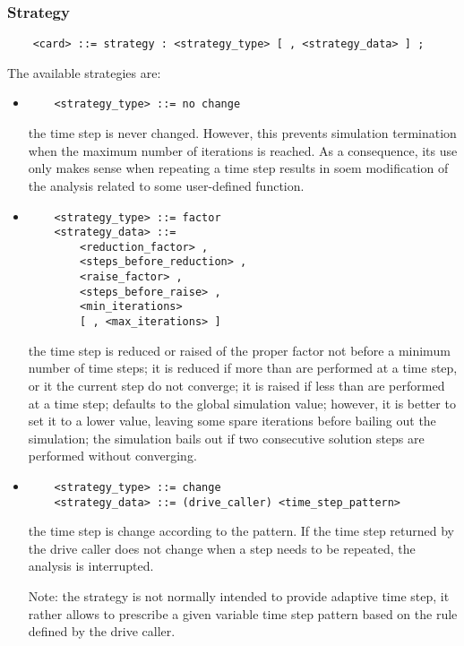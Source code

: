 \subsubsection{Strategy}
\begin{verbatim}
    <card> ::= strategy : <strategy_type> [ , <strategy_data> ] ;
\end{verbatim}
The available strategies are:
\begin{itemize}
\item {}
\begin{verbatim}
    <strategy_type> ::= no change 
\end{verbatim}
the time step is never changed.
However, this prevents simulation termination when the maximum number
of iterations is reached.
As a consequence, its use only makes sense when repeating a time step
results in soem modification of the analysis related to some user-defined
function.

\item {}
\begin{verbatim}
    <strategy_type> ::= factor
    <strategy_data> ::= 
        <reduction_factor> ,
        <steps_before_reduction> ,
        <raise_factor> ,
        <steps_before_raise> ,
        <min_iterations>
        [ , <max_iterations> ]
\end{verbatim}
the time step is reduced or raised of the proper factor not before a
minimum number of time steps; it is reduced if more than 
 are performed at a time step, or it the current
step do not converge; it is raised if less
than  are performed at a time step;
 defaults to the global 
simulation value; however, it is better to set it to a lower value,
leaving some spare iterations before bailing out the simulation; 
the simulation bails out if two consecutive solution steps
are performed without converging.

\item {}
\begin{verbatim}
    <strategy_type> ::= change
    <strategy_data> ::= (drive_caller) <time_step_pattern>
\end{verbatim}
the time step is change according to the  pattern.
If the time step returned by the drive caller does not change
when a step needs to be repeated, the analysis is interrupted.

Note: the  strategy is not normally intended to provide
adaptive time step, it rather allows to prescribe a given
variable time step pattern based on the rule defined
by the  drive caller.
\end{itemize}


